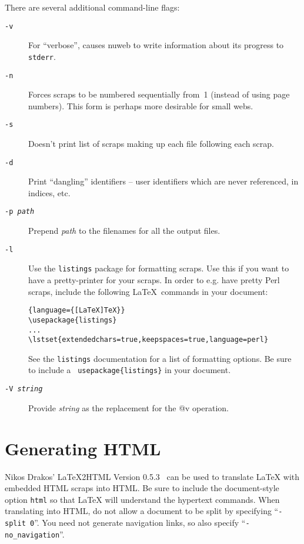 \documentclass[a4paper]{report}
\begin{document}
There are several additional command-line flags:
\begin{description}
\item[\tt -v] For ``verbose'', causes nuweb to write information about
  its progress to \verb|stderr|.
\item[\tt -n] Forces scraps to be numbered sequentially from~1
  (instead of using page numbers). This form is perhaps more desirable
  for small webs.
\item[\tt -s] Doesn't print list of scraps making up each file
  following each scrap.
\item[\tt -d] Print ``dangling'' identifiers -- user identifiers which
  are never referenced, in indices, etc.
\item[\tt -p {\it path}] Prepend \textit{path} to the filenames for
all the output files.
\item[\tt -l] \label{sec:pretty-print} Use the \texttt{listings}
package for formatting scraps. Use this if you want to have a
pretty-printer for your scraps. In order to e.g. have pretty Perl
scraps, include the following \LaTeX\ commands in your document:
\lstset{language=[LaTeX]TeX}

\begin{lstlisting}{language={[LaTeX]TeX}}
\usepackage{listings}
...
\lstset{extendedchars=true,keepspaces=true,language=perl}
\end{lstlisting}

See the \texttt{listings} documentation for a list of formatting
options. Be sure to include a \texttt{
usepackage\{listings\}}
in your document.

\item[\tt -V \it string] Provide \textit{string} as the
replacement for the @v operation.
\end{description}

\section{Generating HTML}

Nikos Drakos' {\LaTeX}2HTML Version 0.5.3~\cite{drakos:94} can be used
to translate {\LaTeX} with embedded HTML scraps into HTML\@.  Be sure
to include the document-style option \verb|html| so that {\LaTeX} will
understand the hypertext commands.  When translating into HTML, do not
allow a document to be split by specifying ``\verb|-split 0|''.
You need not generate navigation links, so also specify
``\verb|-no_navigation|''.
\end{document}
